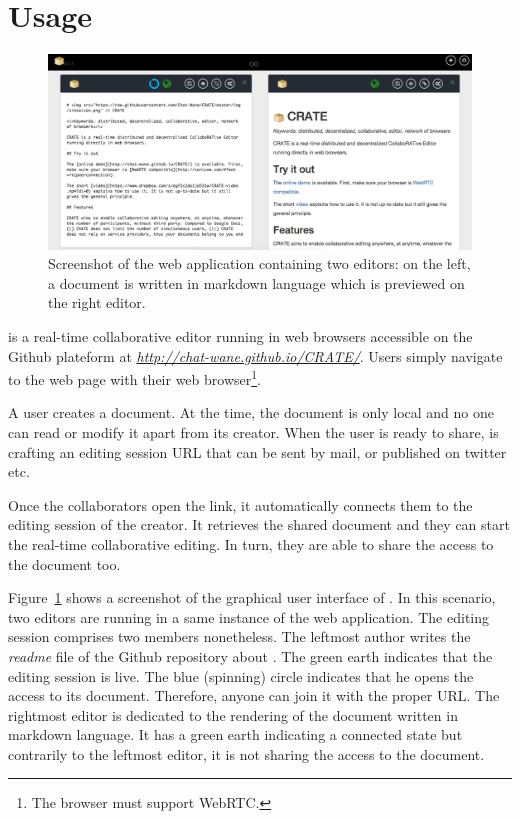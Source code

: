 
\section{Usage}
\label{sec:usage}

\begin{figure}
  \includegraphics[width=\textwidth]{./img/screenshot.png}
  \caption{\label{img:screenshot} Screenshot of the web application containing
    two editors: on the left, a document is written in markdown language which
    is previewed on the right editor.}
\end{figure}

\CRATE is a real-time collaborative editor running in web browsers accessible on
the Github plateform at \emph{\url{http://chat-wane.github.io/CRATE/}}. Users
simply navigate to the web page with their web browser\footnote{The browser must
  support WebRTC.}.

A user creates a document. At the time, the document is only local and
no one can read or modify it apart from its creator. When the user is
ready to share, \CRATE is crafting an editing session URL that can be
sent by mail, or published on twitter etc. 

Once the collaborators open the link, it automatically connects them
to the editing session of the creator. It retrieves the shared
document and they can start the real-time collaborative editing. In
turn, they are able to share the access to the document too. 

Figure~\ref{img:screenshot} shows a screenshot of the graphical user interface
of \CRATE. In this scenario, two editors are running in a same instance of the
web application. The editing session comprises two members nonetheless. The
leftmost author writes the \emph{readme} file of the Github repository about
\CRATE. The green earth indicates that the editing session is live. The blue
(spinning) circle indicates that he opens the access to its document. Therefore,
anyone can join it with the proper URL. The rightmost editor is dedicated to the
rendering of the document written in markdown language. It has a green earth
indicating a connected state but contrarily to the leftmost editor, it is not
sharing the access to the document.

